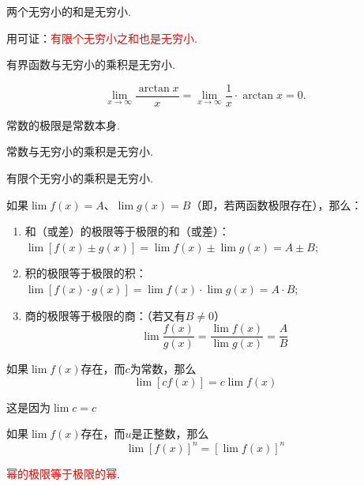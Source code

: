 \documentclass[lang=cn,10pt]{elegantbook}
\begin{document}
\begin{theorem}
	两个无穷小的和是无穷小.
\end{theorem}

\begin{note}
	用可证：\textcolor{red}{有限个无穷小之和也是无穷小}.
\end{note}

\begin{theorem}
	有界函数与无穷小的乘积是无穷小.
\end{theorem}
\begin{example}
	\[ \lim\limits_{x \to \infty}\dfrac{\arctan x}{x} = \lim\limits_{x \to \infty}\dfrac{1}{x} \cdot \arctan x = 0. \]
\end{example}

\begin{note}
	常数的极限是常数本身.
\end{note}

\begin{corollary}
	常数与无穷小的乘积是无穷小.
\end{corollary}

\begin{corollary}
	有限个无穷小的乘积是无穷小.
\end{corollary}

\begin{theorem}
	如果\( \lim f(x) = A \)、\( \lim g(x) = B \)（即，若两函数极限存在），那么：
	\begin{enumerate}
		\item 和（或差）的极限等于极限的和（或差）：\( \lim [f(x) \pm g(x)] = \lim f(x) \pm \lim g(x) = A \pm B \);
		\item 积的极限等于极限的积：\( \lim [f(x) \cdot g(x)] = \lim f(x) \cdot \lim g(x) = A \cdot B \);
		\item 商的极限等于极限的商：（若又有\( B \neq 0 \)）
		\[ \lim \dfrac{f(x)}{g(x)} = \dfrac{\lim f(x)}{\lim g(x)} = \dfrac{A}{B} \]
	\end{enumerate}
\end{theorem}

\begin{corollary}
	如果\( \lim f(x) \)存在，而\( c \)为常数，那么
	\[ \lim [cf(x)] = c\lim f(x) \]
\end{corollary}
\begin{note}
	这是因为\( \lim c = c \)
\end{note}

\begin{corollary}
	如果\( \lim f(x) \)存在，而\( u \)是正整数，那么
	\[ \lim [f(x)]^{n} = [\lim f(x)]^{n} \]
\end{corollary}
\begin{note}
	\textcolor{red}{幂的极限等于极限的幂}.
\end{note}
\end{document}
